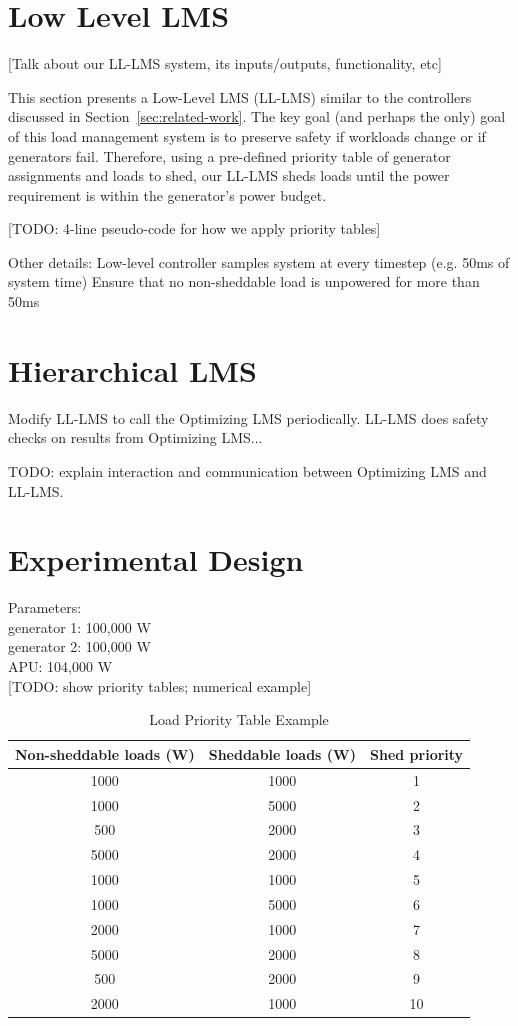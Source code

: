 \documentclass{acm_proc_article-sp}
\begin{document}
\section{Low Level LMS}
[Talk about our LL-LMS system, its inputs/outputs, functionality, etc]

This section presents a Low-Level LMS (LL-LMS) similar to the controllers discussed in Section~\ref{sec:related-work}.
The key goal (and perhaps the only) goal of this load management system is to preserve safety if workloads change or if  generators fail.
Therefore, using a pre-defined priority table of generator assignments and loads to shed, our LL-LMS sheds loads until the power requirement is within the generator's power budget.

[TODO: 4-line pseudo-code for how we apply priority tables]

Other details:
Low-level controller samples system at every  timestep (e.g. 50ms of system time) 
Ensure that no non-sheddable load is unpowered for more  than 50ms 

\section{Hierarchical LMS}
Modify LL-LMS to call the Optimizing LMS periodically.
LL-LMS does safety checks on results from Optimizing LMS...

TODO: explain interaction and communication between Optimizing LMS and LL-LMS.

\section{Experimental Design}

Parameters: \\
generator 1: 100,000 W \\
generator 2: 100,000 W \\
APU: 104,000 W \\

[TODO: show priority tables; numerical example]

\begin{table}[t]
\caption{Load Priority Table Example} %
\label{T:shed} 
\centering
\begin{tabular}{c|cc}
 Non-sheddable loads (W) & Sheddable loads (W) & Shed priority \\ \hline
1000 & 1000 & 1 \\
1000 & 5000 & 2 \\
500 & 2000 & 3 \\
5000 & 2000 & 4 \\
1000 & 1000 & 5 \\
1000 & 5000 & 6 \\
2000 & 1000 & 7 \\
5000 & 2000 & 8 \\
500 & 2000 & 9 \\
2000 & 1000 & 10 \\ \hline
\end{tabular}
\end{table}
\end{document}
